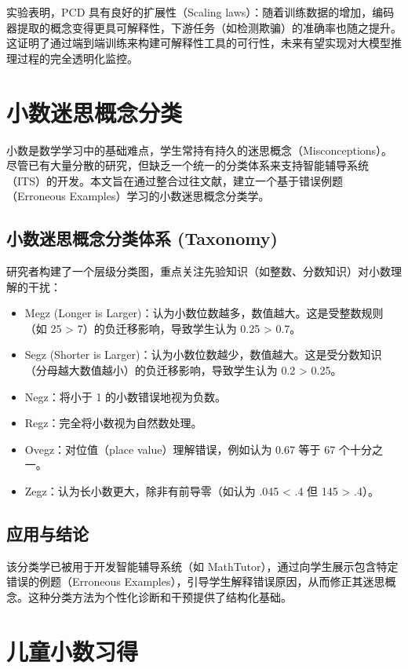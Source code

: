 实验表明，PCD 具有良好的扩展性（Scaling laws）：随着训练数据的增加，编码器提取的概念变得更具可解释性，下游任务（如检测欺骗）的准确率也随之提升。这证明了通过端到端训练来构建可解释性工具的可行性，未来有望实现对大模型推理过程的完全透明化监控。

\section{小数迷思概念分类}

小数是数学学习中的基础难点，学生常持有持久的迷思概念（Misconceptions）。尽管已有大量分散的研究，但缺乏一个统一的分类体系来支持智能辅导系统（ITS）的开发。本文旨在通过整合过往文献，建立一个基于错误例题（Erroneous Examples）学习的小数迷思概念分类学。

\subsection{小数迷思概念分类体系 (Taxonomy)}

研究者构建了一个层级分类图，重点关注先验知识（如整数、分数知识）对小数理解的干扰：
\begin{itemize}
    \item Megz (Longer is Larger)：认为小数位数越多，数值越大。这是受整数规则（如 25 > 7）的负迁移影响，导致学生认为 0.25 > 0.7。
    \item Segz (Shorter is Larger)：认为小数位数越少，数值越大。这是受分数知识（分母越大数值越小）的负迁移影响，导致学生认为 0.2 > 0.25。
    \item Negz：将小于 1 的小数错误地视为负数。
    \item Regz：完全将小数视为自然数处理。
    \item Ovegz：对位值（place value）理解错误，例如认为 0.67 等于 67 个十分之一。
    \item Zegz：认为长小数更大，除非有前导零（如认为 .045 < .4 但 145 > .4）。
\end{itemize}

\subsection{应用与结论}

该分类学已被用于开发智能辅导系统（如 MathTutor），通过向学生展示包含特定错误的例题（Erroneous Examples），引导学生解释错误原因，从而修正其迷思概念。这种分类方法为个性化诊断和干预提供了结构化基础。

\section{儿童小数习得}

